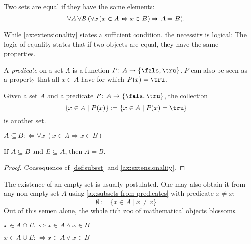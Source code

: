 \begin{axiom}[Extensionality]\label{ax:extensionality}
Two sets are equal if they have the same elements:
\[
\forall A \, \forall B \, ( \forall x \, (x\in A \Leftrightarrow x\in B) \Rightarrow A=B). \qedhere
\]
\end{axiom}
While \autoref{ax:extensionality} states a sufficient condition, the necessity is logical:
The logic of equality states that if two objects are equal, they have the same properties.

\begin{definition}[Predicate]\label{def:predicate}
A \emph{predicate} on a set \(A\) is a function \(P\colon A\to\{\fals, \tru\}\).
\(P\) can also be seen as a property that all \(x \in A\) have for which \(P(x)=\tru\).
\end{definition}
\begin{axiom}\label{ax:subsets-from-predicates}
Given a set \(A\) and a predicate \(P\colon A\to\{\fals, \tru \}\), the collection
\[
\{x\in A \mid P(x)\} := \{x\in A \mid P(x)=\tru\}
\]
is another set.
\end{axiom}

\begin{definition}[Subset]\label{def:subset}
\(
A\subseteq B :\Longleftrightarrow \forall x \, (x\in A\Rightarrow x\in B) 
\)
\end{definition}

\begin{theorem}\label{thm:subset-equality}
If \(A\subseteq B\) and \(B\subseteq A\), then \(A=B\).
\end{theorem}
\begin{proof}
Consequence of \autoref{def:subset} and \autoref{ax:extensionality}.
\end{proof}


The existence of an empty set is usually postulated.  
One may also obtain it from any non-empty set \(A\) using \autoref{ax:subsets-from-predicates} with predicate \(x\neq x\):
\[
\emptyset:=\{x\in A \mid x\neq x\}
\]
Out of this semen alone, the whole rich zoo of mathematical objects blossoms.


\begin{definition}[Intersection]\label{def:intersection}
\(
x\in A\cap B :\Longleftrightarrow x\in A\wedge x\in B
\)
\end{definition}

\begin{axiom}[Union]\label{ax:union}
\(
x \in A\cup B :\Longleftrightarrow x\in A\vee x\in B
\)
\end{axiom}



